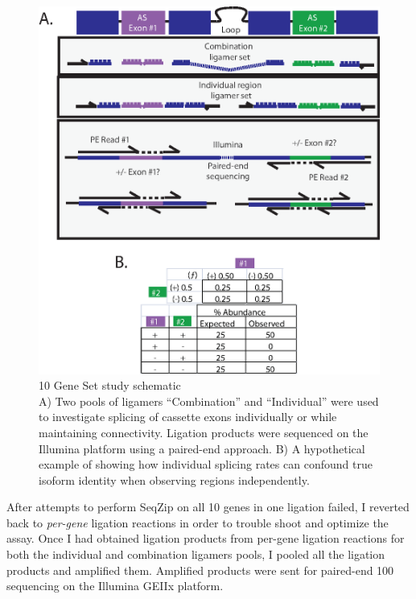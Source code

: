   \begin{figure} %
    \centering 
    \includegraphics{Figures/SeqZipMethod/10GeneSetSchematic.eps}
    \caption[10 Gene Set study schematic]
    {
      10 Gene Set study schematic\\[0.25cm]
      A) Two pools of ligamers ``Combination'' and ``Individual'' were used to investigate splicing of cassette exons individually or while maintaining connectivity. Ligation products were sequenced on the Illumina platform using a paired-end approach. B) A hypothetical example of showing how individual splicing rates can confound true isoform identity when observing regions independently.
	    }
    \label{SeqZipMethod:fig:Multiplex Study Design}
  	\end{figure}

  After attempts to perform SeqZip on all 10 genes in one ligation failed, I reverted back to \textit{per-gene} ligation reactions in order to trouble shoot and optimize the assay. Once I had obtained ligation products from per-gene ligation reactions for both the individual and combination ligamers pools, I pooled all the ligation products and amplified them. Amplified products were sent for paired-end 100 sequencing on the Illumina GEIIx platform. 


